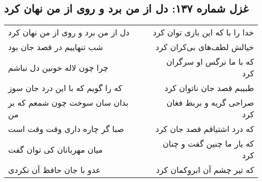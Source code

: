 \begin{center}
\section*{غزل شماره ۱۳۷: دل از من برد و روی از من نهان کرد}
\label{sec:sh137}
\begin{longtable}{l p{0.5cm} r}
دل از من برد و روی از من نهان کرد
&&
خدا را با که این بازی توان کرد
\\
شب تنهاییم در قصد جان بود
&&
خیالش لطف‌های بی‌کران کرد
\\
چرا چون لاله خونین دل نباشم
&&
که با ما نرگس او سرگران کرد
\\
که را گویم که با این درد جان سوز
&&
طبیبم قصد جان ناتوان کرد
\\
بدان سان سوخت چون شمعم که بر من
&&
صراحی گریه و بربط فغان کرد
\\
صبا گر چاره داری وقت وقت است
&&
که درد اشتیاقم قصد جان کرد
\\
میان مهربانان کی توان گفت
&&
که یار ما چنین گفت و چنان کرد
\\
عدو با جان حافظ آن نکردی
&&
که تیر چشم آن ابروکمان کرد
\\
\end{longtable}
\end{center}
